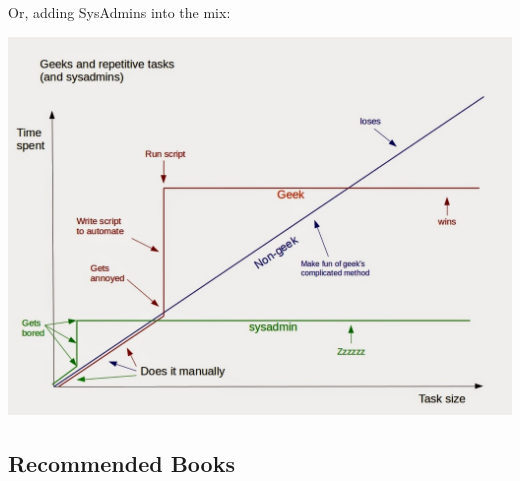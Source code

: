\documentclass[aspectratio=169]{beamer}
\begin{document}
\begin{frame}
Or, adding SysAdmins into the mix:

\centering
\vspace{10pt}
\includegraphics[height=0.8\textheight]{Geeks2.jpg}

\end{frame}


\subsection{Recommended Books}
\end{document}
